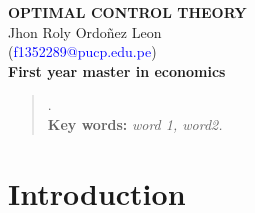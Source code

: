 \documentclass[11pt]{article}
\begin{document}
	\begin{titlepage}
		\vspace*{5cm}
		{\Large
			\begin{center}
				{\Huge \textbf{OPTIMAL CONTROL THEORY}}
				\vspace{0.5cm}\\
				Jhon Roly Ordoñez Leon\\
				(\textcolor{blue}{f1352289@pucp.edu.pe})
				\vspace{0.5cm}\\
				\textbf{First year master in economics}
			\end{center}
		}
		\date{\today}
		\begin{abstract}
			\lipsum[1].\\
			\textbf{Key words:} \hspace{1mm} \textit{word 1, word2.}
		\end{abstract}
		\textcolor{red}{\tableofcontents}
	\end{titlepage}

	\section{Introduction}
		\lipsum[1]




	\section{}
		\lipsum[1]



	
		

		\nocite{wooldridge-2016}

\end{document}

